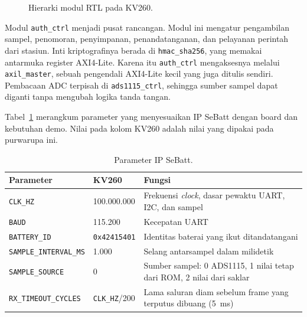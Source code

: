 \documentclass[11pt,a4paper]{article}
\begin{document}
\begin{figure}[H]
  \caption{Hierarki modul RTL pada KV260.}
  \label{fig:hierarki}
\end{figure}

Modul \texttt{auth\_ctrl} menjadi pusat rancangan. Modul ini mengatur pengambilan sampel,
penomoran, penyimpanan, penandatanganan, dan pelayanan perintah dari stasiun. Inti kriptografinya
berada di \texttt{hmac\_sha256}, yang memakai antarmuka register AXI4-Lite. Karena itu
\texttt{auth\_ctrl} mengaksesnya melalui \texttt{axil\_master}, sebuah pengendali AXI4-Lite kecil
yang juga ditulis sendiri. Pembacaan ADC terpisah di \texttt{ads1115\_ctrl}, sehingga sumber
sampel dapat diganti tanpa mengubah logika tanda tangan.

Tabel~\ref{tab:parameter} merangkum parameter yang menyesuaikan IP SeBatt dengan board dan
kebutuhan demo. Nilai pada kolom KV260 adalah nilai yang dipakai pada purwarupa ini.

\begin{table}[H]
  \centering
  \small
  \begin{tabularx}{\textwidth}{l l X}
    \toprule
    Parameter & KV260 & Fungsi \\
    \midrule
    \texttt{CLK\_HZ} & 100.000.000 & Frekuensi \textit{clock}, dasar pewaktu UART, I2C, dan sampel \\
    \texttt{BAUD} & 115.200 & Kecepatan UART \\
    \texttt{BATTERY\_ID} & \texttt{0x42415401} & Identitas baterai yang ikut ditandatangani \\
    \texttt{SAMPLE\_INTERVAL\_MS} & 1.000 & Selang antarsampel dalam milidetik \\
    \texttt{SAMPLE\_SOURCE} & 0 & Sumber sampel: 0 ADS1115, 1 nilai tetap dari ROM, 2 nilai dari
      saklar \\
    \texttt{RX\_TIMEOUT\_CYCLES} & \texttt{CLK\_HZ}/200 & Lama saluran diam sebelum frame yang
      terputus dibuang (5~ms) \\
    \bottomrule
  \end{tabularx}
  \caption{Parameter IP SeBatt.}
  \label{tab:parameter}
\end{table}
\end{document}
